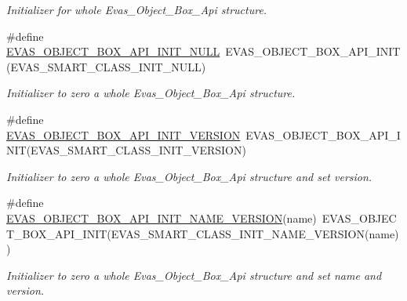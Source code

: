 \begin{DoxyCompactItemize}
\begin{DoxyCompactList}\small\item\em Initializer for whole Evas\_\-Object\_\-Box\_\-Api structure. \item\end{DoxyCompactList}\item 
\#define \hyperlink{group__Evas__Object__Box_gacfe469ef2fc811ab4af8c77105bf4baa}{EVAS\_\-OBJECT\_\-BOX\_\-API\_\-INIT\_\-NULL}~EVAS\_\-OBJECT\_\-BOX\_\-API\_\-INIT(EVAS\_\-SMART\_\-CLASS\_\-INIT\_\-NULL)
\begin{DoxyCompactList}\small\item\em Initializer to zero a whole Evas\_\-Object\_\-Box\_\-Api structure. \item\end{DoxyCompactList}\item 
\#define \hyperlink{group__Evas__Object__Box_gabab7b773ecb31ecbf661646d5db1bea1}{EVAS\_\-OBJECT\_\-BOX\_\-API\_\-INIT\_\-VERSION}~EVAS\_\-OBJECT\_\-BOX\_\-API\_\-INIT(EVAS\_\-SMART\_\-CLASS\_\-INIT\_\-VERSION)
\begin{DoxyCompactList}\small\item\em Initializer to zero a whole Evas\_\-Object\_\-Box\_\-Api structure and set version. \item\end{DoxyCompactList}\item 
\#define \hyperlink{group__Evas__Object__Box_gad35b8c6b395f976397abbb6f964878e7}{EVAS\_\-OBJECT\_\-BOX\_\-API\_\-INIT\_\-NAME\_\-VERSION}(name)~EVAS\_\-OBJECT\_\-BOX\_\-API\_\-INIT(EVAS\_\-SMART\_\-CLASS\_\-INIT\_\-NAME\_\-VERSION(name))
\begin{DoxyCompactList}\small\item\em Initializer to zero a whole Evas\_\-Object\_\-Box\_\-Api structure and set name and version. \item\end{DoxyCompactList}\end{DoxyCompactItemize}
